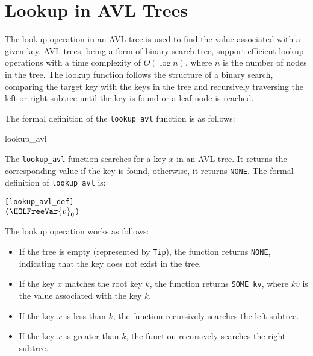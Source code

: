 \chapter{Lookup in AVL Trees}\label{chap:LaTeXAdvice}

The lookup operation in an AVL tree is used to find the value associated with a given key. AVL trees, being a form of binary search tree, support efficient lookup operations with a time complexity of \( O(\log n) \), where \( n \) is the number of nodes in the tree. The lookup function follows the structure of a binary search, comparing the target key with the keys in the tree and recursively traversing the left or right subtree until the key is found or a leaf node is reached.

The formal definition of the \texttt{lookup\_avl} function is as follows:

\begin{defn}{lookup\_avl}

The \texttt{lookup\_avl} function searches for a key \( x \) in an AVL tree. It returns the corresponding value if the key is found, otherwise, it returns \texttt{NONE}. The formal definition of \texttt{lookup\_avl} is:


\begin{alltt}
	[lookup_avl_def]
	   \HOLTokenDefEquality{} 
  ( \ensuremath{\HOLFreeVar{v}\sb{\mathrm{0}}}    ) \HOLTokenDefEquality{}
    \HOLSymConst{=}    
     \HOLSymConst{\HOLTokenLt{}}     
     
\end{alltt}

\end{defn}


The lookup operation works as follows:
\begin{itemize}
    \item If the tree is empty (represented by \texttt{Tip}), the function returns \texttt{NONE}, indicating that the key does not exist in the tree.
    \item If the key \( x \) matches the root key \( k \), the function returns \texttt{SOME kv}, where \( kv \) is the value associated with the key \( k \).
    \item If the key \( x \) is less than \( k \), the function recursively searches the left subtree.
    \item If the key \( x \) is greater than \( k \), the function recursively searches the right subtree.
\end{itemize}

